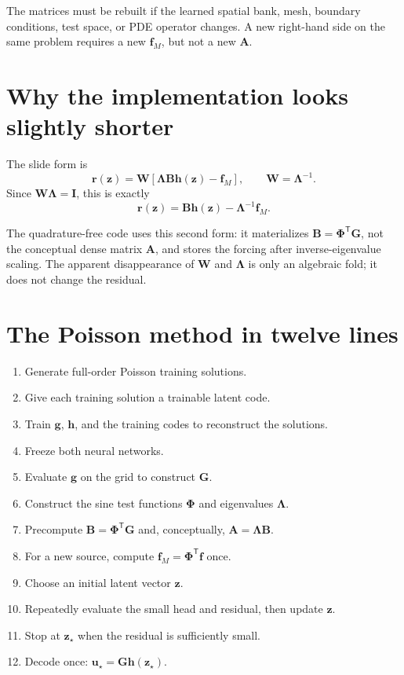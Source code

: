 \documentclass[11pt]{article}
\newcommand{\mat}[1]{\mathbf{#1}}
\newcommand{\vect}[1]{\mathbf{#1}}
\begin{document}
The matrices must be rebuilt if the learned spatial bank, mesh, boundary
conditions, test space, or PDE operator changes.  A new right-hand side on the
same problem requires a new $\vect{f}_M$, but not a new $\mat{A}$.

\section{Why the implementation looks slightly shorter}

The slide form is
\begin{equation}
  \vect{r}(\vect{z})
  =\mat{W}\left[
     \mat{\Lambda}\mat{B}\vect{h}(\vect{z})-\vect{f}_M
   \right],
  \qquad
  \mat{W}=\mat{\Lambda}^{-1}.
\end{equation}
Since $\mat{W}\mat{\Lambda}=\mat{I}$, this is exactly
\begin{equation}
  \vect{r}(\vect{z})
  =\mat{B}\vect{h}(\vect{z})
   -\mat{\Lambda}^{-1}\vect{f}_M.
\end{equation}

The quadrature-free code uses this second form: it materializes
$\mat{B}=\mat{\Phi}^{\mathsf T}\mat{G}$, not the conceptual dense matrix
$\mat{A}$, and stores the forcing after inverse-eigenvalue scaling.  The
apparent disappearance of $\mat{W}$ and $\mat{\Lambda}$ is only an algebraic
fold; it does not change the residual.

\section{The Poisson method in twelve lines}

\begin{enumerate}
  \item Generate full-order Poisson training solutions.
  \item Give each training solution a trainable latent code.
  \item Train $\vect{g}$, $\vect{h}$, and the training codes to reconstruct the solutions.
  \item Freeze both neural networks.
  \item Evaluate $\vect{g}$ on the grid to construct $\mat{G}$.
  \item Construct the sine test functions $\mat{\Phi}$ and eigenvalues $\mat{\Lambda}$.
  \item Precompute $\mat{B}=\mat{\Phi}^{\mathsf T}\mat{G}$ and, conceptually,
        $\mat{A}=\mat{\Lambda}\mat{B}$.
  \item For a new source, compute $\vect{f}_M=\mat{\Phi}^{\mathsf T}\vect{f}$ once.
  \item Choose an initial latent vector $\vect{z}$.
  \item Repeatedly evaluate the small head and residual, then update $\vect{z}$.
  \item Stop at $\vect{z}_\star$ when the residual is sufficiently small.
  \item Decode once: $\vect{u}_\star=\mat{G}\vect{h}(\vect{z}_\star)$.
\end{enumerate}
\end{document}
